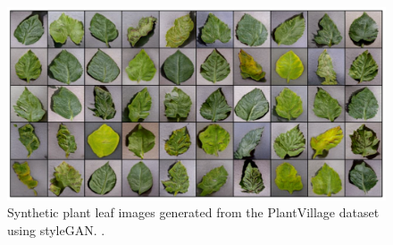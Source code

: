 \begin{figure}[!htb]
    \centering
    \includegraphics[scale=2, keepaspectratio]{Figures/styleGAN.png}
    \caption{Synthetic plant leaf images generated from the PlantVillage dataset using styleGAN. \cite{arsenovic2019solving}.}
    \label{fig:my_style_gan}
\end{figure} 

